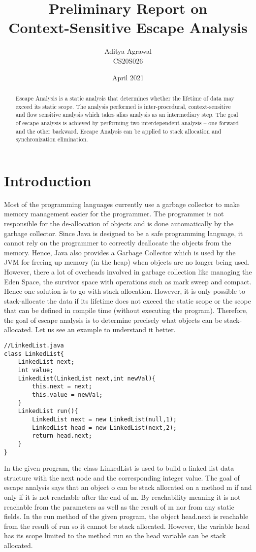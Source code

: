 \documentclass[peerreview]{IEEEtran}
\title{Preliminary Report on \\ Context-Sensitive Escape Analysis}
\author{Aditya Agrawal \\
CS20S026\\
}
\date{April 2021}
\begin{document}
\maketitle
\tableofcontents
\IEEEpeerreviewmaketitle
\begin{abstract}
Escape Analysis is a static analysis that determines whether the lifetime of data may exceed its static scope. The analysis performed is inter-procedural, context-sensitive and flow sensitive analysis which takes alias analysis as an intermediary step. The goal of escape analysis is achieved by performing two interdependent analysis – one forward and the other backward. Escape Analysis can be applied to stack allocation and synchronization elimination.
\end{abstract}
\section{Introduction}
Most of the programming languages currently use a garbage collector to make memory management easier for the programmer. The programmer is not responsible for the de-allocation of objects and is done automatically by the garbage collector. Since Java is designed to be a safe programming language, it cannot rely on the programmer to correctly deallocate the objects from the memory. Hence, Java also provides a Garbage Collector which is used by the JVM for freeing up memory (in the heap) when objects are no longer being used. However, there a lot of overheads involved in garbage collection like managing the Eden Space, the survivor space with operations such as mark sweep and compact. Hence one solution is to go with stack allocation. However, it is only possible to stack-allocate the data if its lifetime does not exceed the static scope or the scope that can be defined in compile time (without executing the program). Therefore, the goal of escape analysis is to determine precisely what objects can be stack-allocated. Let us see an example to understand it better. 
\begin{lstlisting}
//LinkedList.java
class LinkedList{
	LinkedList next;
	int value;
	LinkedList(LinkedList next,int newVal){
		this.next = next;
		this.value = newVal;
	}
	LinkedList run(){
		LinkedList next = new LinkedList(null,1);
		LinkedList head = new LinkedList(next,2);
		return head.next;
	}
}
\end{lstlisting}
In the given program, the class LinkedList is used to build a linked list data structure with the next node and the corresponding integer value. The goal of escape analysis says that an object o can be stack allocated on a method m if and only if it is not reachable after the end of m. By reachability meaning it is not reachable from the parameters as well as the result of m nor from any static fields. In the run method of the given program, the object head.next is reachable from the result of run so it cannot be stack allocated. However, the variable head has its scope limited to the method run so the head variable can be stack allocated.
\end{document}
